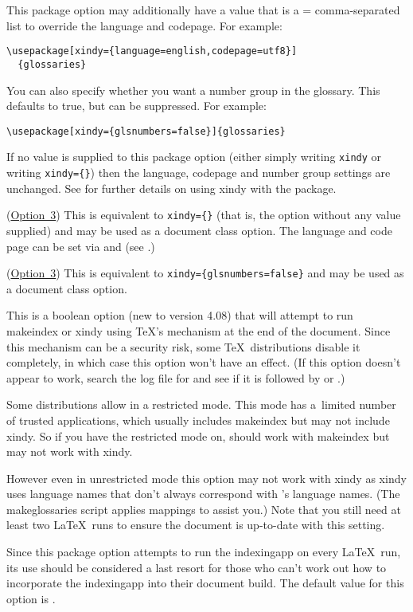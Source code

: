 \documentclass[report,inlinetitle]{nlctdoc}
\newcommand*{\opt}[1]{\hyperlink{option#1}{Option~#1}}
\begin{document}
\begin{description}
This package option may additionally have a value that
is a = comma-separated list to override the
language and codepage. For example:
\begin{verbatim}
\usepackage[xindy={language=english,codepage=utf8}]
  {glossaries}
\end{verbatim}
You can also specify whether you want a number group in the
glossary. This defaults to true, but can be suppressed. For example:
\begin{verbatim}
\usepackage[xindy={glsnumbers=false}]{glossaries}
\end{verbatim}
If no value is supplied to this package option (either simply
writing \texttt{xindy} or writing \verb|xindy={}|) then the
language, codepage and number group settings are unchanged.  See
 for further details on using \gls{xindy} with
the  package.

\item[\pkgopt{xindygloss}]  (\opt3) This is equivalent to
\verb|xindy={}| (that is, the  option without any value
supplied) and may be used as a document class option. The language
and code page can be set via  and
 (see .)

\item[\pkgopt{xindynoglsnumbers}] (\opt3) This is equivalent to
\verb|xindy={glsnumbers=false}| and may be used as a document class
option.

\item[\pkgopt{automake}] This is a boolean option (new to version
4.08) that will attempt to run \gls{makeindex} or \gls{xindy} using
\TeX's  mechanism at the end of the document.  Since
this mechanism can be a security risk, some \TeX\ distributions
disable it completely, in which case this option won't have an
effect. (If this option doesn't appear to work, search the log file 
for  and see if it is followed by
 or .)

Some distributions allow  in a restricted mode.
This mode has a~limited number of trusted applications, which
usually includes \gls{makeindex} but may not include \gls{xindy}. So
if you have the restricted mode on,  should work
with \gls*{makeindex} but may not work with \gls{xindy}.

However even in unrestricted mode this option may not work with
\gls*{xindy} as \gls*{xindy} uses language names that don't always
correspond with 's language names. (The
\gls{makeglossaries} script applies mappings to assist you.)
Note that you still need at least two \LaTeX\ runs to ensure the document
is up-to-date with this setting.

Since this package option attempts to run the \gls{indexingapp} on
every \LaTeX\ run, its use should be considered a last resort for
those who can't work out how to incorporate the \gls*{indexingapp}
into their document build. The default value for this option is
.

\end{description}
\end{document}
